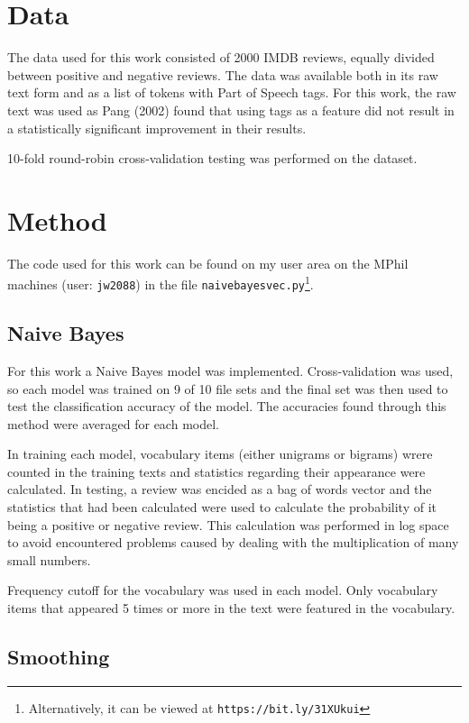 \documentclass[twocolumn]{article}
\begin{document}
\section{Data}

The data used for this work consisted of 2000 IMDB reviews, equally divided between positive and negative reviews. The data was available both in its raw text form and as a list of tokens with Part of Speech tags. For this work, the raw text was used as Pang (2002) found that using tags as a feature did not result in a statistically significant improvement in their results. 

10-fold round-robin cross-validation testing was performed on the dataset.

\section{Method}


The code used for this work can be found on my user area on the MPhil machines (user: \texttt{jw2088}) in the file \texttt{naivebayesvec.py}\footnote{Alternatively, it can be viewed at \texttt{https://bit.ly/31XUkui}}.

\subsection{Naive Bayes}

For this work a Naive Bayes model was implemented. Cross-validation was used, so each model was trained on 9 of 10 file sets and the final set was then used to test the classification accuracy of the model. The accuracies found through this method were averaged for each model. 

In training each model, vocabulary items (either unigrams or bigrams) wrere counted in the training texts and statistics regarding their appearance were calculated. In testing, a review was encided as a bag of words vector and the statistics that had been calculated were used to calculate the probability of it being a positive or negative review. This calculation was performed in log space to avoid encountered problems caused by dealing with the multiplication of many small numbers.

Frequency cutoff for the vocabulary was used in each model. Only vocabulary items that appeared 5 times or more in the text were featured in the vocabulary.

\subsection{Smoothing}
\end{document}
